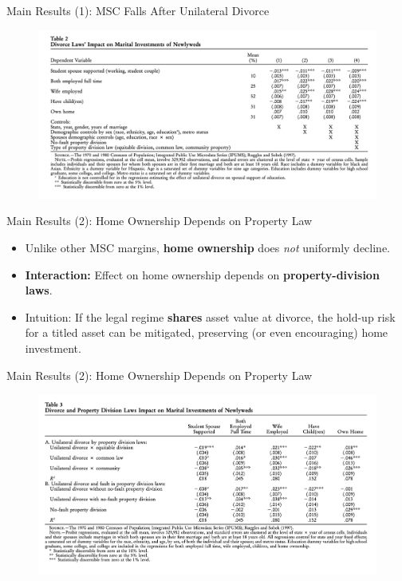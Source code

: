 \documentclass[11pt,notes=hide,aspectratio=169,mathserif]{beamer}
\begin{document}
\begin{frame}{Main Results (1): MSC Falls After Unilateral Divorce}
\small
\begin{figure}
  \centering
  \includegraphics[width=0.95\linewidth]{inputs/fig10.png}
  \end{figure}
\end{frame}


\begin{frame}{Main Results (2): Home Ownership Depends on Property Law}
\small
\begin{itemize}
  \item Unlike other MSC margins, \textbf{home ownership} does \emph{not} uniformly decline.
  \item \textbf{Interaction:} Effect on home ownership depends on \textbf{property-division laws}.
  \item Intuition: If the legal regime \textbf{shares} asset value at divorce, the hold-up risk for a titled asset can be mitigated, preserving (or even encouraging) home investment.
\end{itemize}
\end{frame}

\begin{frame}{Main Results (2): Home Ownership Depends on Property Law}
\small
\begin{figure}
  \centering
  \includegraphics[width=0.95\linewidth]{inputs/fig11.png}
  \end{figure}
\end{frame}
\end{document}
